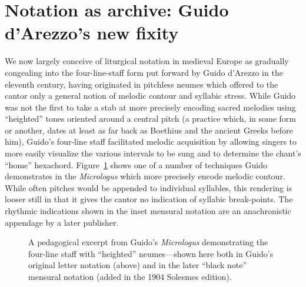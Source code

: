     \section{Notation as archive: Guido d'Arezzo's new fixity}

    We now largely conceive of liturgical notation in medieval Europe as gradually congealing into the four-line-staff form put forward by Guido d'Arezzo in the eleventh century, having originated in pitchless neumes which offered to the cantor only a general notion of melodic contour and syllabic stress.\autocite[16]{Taruskin_2009} While Guido was not the first to take a stab at more precisely encoding sacred melodies using ``heighted'' tones oriented around a central pitch (a practice which, in some form or another, dates at least as far back as Boethius and the ancient Greeks before him\autocite[17]{Taruskin_2009}), Guido's four-line staff facilitated melodic acquisition by allowing singers to more easily visualize the various intervals to be sung and to determine the chant's ``home'' hexachord.\autocite[53]{Reisenweaver_2012} Figure~\ref{fig:guidonew} shows one of a number of techniques Guido demonstrates in the \textit{Micrologus} which more precisely encode melodic contour. While often pitches would be appended to individual syllables, this rendering is looser still in that it gives the cantor no indication of syllabic break-points. The rhythmic indications shown in the inset mensural notation are an anachronistic appendage by a later publisher.

        \begin{figure}
            \centering
            \captionsetup{width=.5\linewidth}
            \caption[A pedagogical excerpt from Guido's \textit{Micrologus} demonstrating the four-line staff with ``heighted'' neumes---shown here both in Guido's original letter notation (above) and in the later ``black note'' mensural notation (added in the 1904 Solesmes edition).]{A pedagogical excerpt from Guido's \textit{Micrologus} demonstrating the four-line staff with ``heighted'' neumes---shown here both in Guido's original letter notation (above) and in the later ``black note'' mensural notation (added in the 1904 Solesmes edition).\footnotemark}
            \label{fig:guidonew}
        \end{figure}

